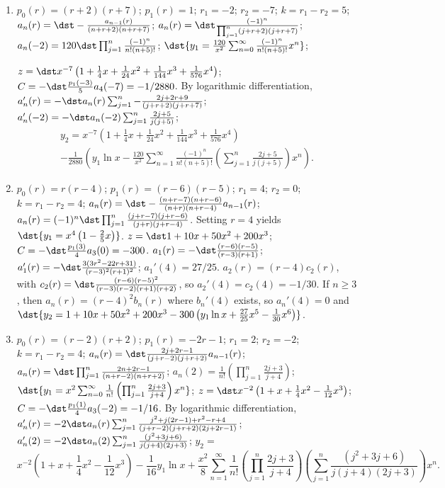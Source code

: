\documentclass[openany]{book}
\newenvironment{sectionSolutions}{
 \begin{enumerate}[item-label={\thesection.\arabic{enumi}.}]
}{
 \end{enumerate}
}
\begin{document}
\begin{sectionSolutions}
\item
$p_0(r)=(r+2)(r+7)$;
$p_1(r)=1$;
$r_1=-2$; $r_2=-7$; $k=r_1-r_2=5$;
$a_n(r)=\dst-\frac{a_{n-1}(r)}{(n+r+2)(n+r+7)}$;
$a_n(r)=\dst\frac{(-1)^n}{\prod_{j=1}^n(j+r+2)(j+r+7)}$;
$a_n(-2)=120\dst\prod_{j=1}^n\frac{(-1)^n}{ n!(n+5)!}$;
$\dst{y_1=\frac{120}{ x^2}\sum_{n=0}^\infty\frac{(-1)^n}{
n!(n+5)!}x^n}$;

$z=\dst
x^{-7}\left(1+\frac{1}{4}x+\frac{1}{24}x^2+\frac{1}{144}x^3
+\frac{1}{576}x^4\right)$;
$C=-\dst\frac{p_1(-3)}{5}a_4(-7)=-1/2880$.
By logarithmic differentiation,
$a_n'(r)=-\dst a_n(r)\sum_{j=1}^n-\frac{2j+2r+9}{(j+r+2)(j+r+7)}$;
$a_n'(-2)=-\dst a_n(-2)\sum_{j=1}^n\frac{2j+5}{ j(j+5)}$;
\begin{multline*}
y_2=x^{-7}\left(1+\frac{1}{4}x+\frac{1}{24}x^2+\frac{1}{144}x^3
+\frac{1}{576}x^4\right)\\
-\frac{1}{2880}\left(y_1\ln x-\frac{120}{ x^2}
\sum_{n=1}^\infty\frac{(-1)^n}{
n!(n+5)!}\left(\sum_{j=1}^n\frac{2j+5}{ j(j+5)}\right)x^n\right).
\end{multline*}


\item
$p_0(r)=r(r-4)$;
$p_1(r)=(r-6)(r-5)$;
$r_1=4$; $r_2=0$; $k=r_1-r_2=4$;
$a_n(r)=\dst
-\frac{(n+r-7)(n+r-6)}{(n+r)(n+r-4)}
a_{n-1}(r)$;
 $a_n(r)=(-1)^n\dst\prod_{j=1}^n\frac{(j+r-7)(j+r-6)}{(j+r)(j+r-4)}$.
Setting $r=4$ yields
$\dst{y_1=x^4\left(1-\frac{2}{5}x\right)}$.
$z=\dst1+10x+50x^2+200x^3$;
$C=-\dst\frac{p_1(3)}{ 4}a_3(0)=-300$.
$a_1(r)=-\dst\frac{(r-6)(r-5)}{(r-3)(r+1)}$;
$a_1'(r)=-\dst\frac{3(3r^2-22r+31)}{(r-3)^2(r+1)^2}$;
$a_1'(4)=27/25$.
$a_2(r)=(r-4)c_2(r)$, with
$c_2(r)=\dst\frac{(r-6)(r-5)^2}{(r-3)(r-2)(r+1)(r+2)}$, so
$a_2'(4)=c_2(4)=-1/30$.
If $n\ge3$, then $a_n(r)=(r-4)^2b_n(r)$ where $b_n'(4)$ exists, so
$a_n'(4)=0$  and
$\dst{y_2=1+10x+50x^2+200x^3-300\left(y_1\ln
x+\frac{27}{25}x^5-\frac{1}{30}x^6\right)}$.


\item
$p_0(r)=(r-2)(r+2)$;
$p_1(r)=-2r-1$;
$r_1=2$; $r_2=-2$; $k=r_1-r_2=4$;
$a_n(r)=\dst\frac{2j+2r-1}{(j+r-2)(j+r+2)}
a_{n-1}(r)$;
 $a_n(r)=\dst\prod_{j=1}^n\frac{2n+2r-1}{(n+r-2)(n+r+2)}$;
$a_n(2)=\frac{1}{ n!}\left(\prod_{j=1}^n\frac{2j+3}{ j+4}\right)$;
$\dst{y_1=x^2\sum_{n=0}^\infty\frac{1}{ n!}\left(\prod_{j=1}^n\frac{2j+3}{
j+4}\right)x^n}$;
$z=\dst x^{-2}\left(1+x+\frac{1}{4}x^2-\frac{1}{12}x^3\right)$;
$C=-\dst\frac{p_1(1)}{ 4}a_3(-2)=-1/16$.
By logarithmic differentiation,
$a_n'(r)=-2\dst a_n(r)\sum_{j=1}^n
\frac{j^2+j(2r-1)+r^2-r+4}{(j+r-2)(j+r+2)(2j+2r-1)}$;
$a_n'(2)=-2\dst a_n(2)\sum_{j=1}^n\frac{(j^2+3j+6)}{
j(j+4)(2j+3)}$; $y_2=$
\[
x^{-2}\left(1+x+\frac{1}{4}x^2-\frac{1}{12}x^3\right)-\frac{1}{16}
y_1\ln x+ \frac{x^2}{8}\sum_{n=1}^\infty\frac{1}{
n!}\left(\prod_{j=1}^n\frac{2j+3}{ j+4}
\right)\left(\sum_{j=1}^n\frac{(j^2+3j+6)}{ j(j+4)(2j+3)}\right)x^n.
\]



\end{sectionSolutions}
\end{document}
